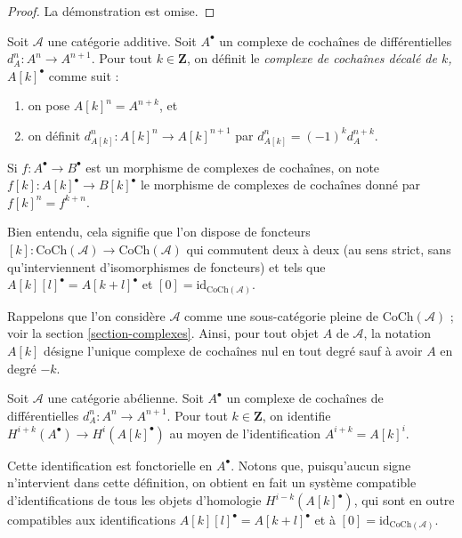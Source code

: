 \begin{proof}
La démonstration est omise.
\end{proof}

\begin{definition}
\label{definition-shift-cochain}
Soit $\mathcal{A}$ une catégorie additive.
Soit $A^\bullet$ un complexe de cochaînes
de différentielles $d_A^n : A^n \to A^{n + 1}$.
Pour tout $k \in \mathbf{Z}$, on définit le
{\it complexe de cochaînes décalé de $k$, $A[k]^\bullet$}
comme suit :
\begin{enumerate}
\item on pose $A[k]^n = A^{n + k}$, et
\item on définit $d_{A[k]}^n : A[k]^n \to A[k]^{n + 1}$
par $d_{A[k]}^n = (-1)^k d_A^{n + k}$.
\end{enumerate}
Si $f : A^\bullet \to B^\bullet$ est un morphisme de
complexes de cochaînes, on note
$f[k] : A[k]^\bullet \to B[k]^\bullet$ le
morphisme de complexes de cochaînes donné par
$f[k]^n = f^{k + n}$.
\end{definition}

\noindent
Bien entendu, cela signifie que l'on dispose de foncteurs
$[k] : \text{CoCh}(\mathcal{A}) \to \text{CoCh}(\mathcal{A})$
qui commutent deux à deux (au sens strict, sans
qu'interviennent d'isomorphismes de foncteurs) et
tels que $A[k][l]^\bullet = A[k + l]^\bullet$ et
$[0] = \text{id}_{\text{CoCh}(\mathcal{A})}$.

\medskip\noindent
Rappelons que l'on considère $\mathcal{A}$ comme une sous-catégorie pleine de
$\text{CoCh}(\mathcal{A})$ ; voir la section \ref{section-complexes}.
Ainsi, pour tout objet $A$ de $\mathcal{A}$, la notation $A[k]$
désigne l'unique complexe de cochaînes nul en tout degré sauf à avoir
$A$ en degré $-k$.

\begin{definition}
\label{definition-cohomology-shift}
Soit $\mathcal{A}$ une catégorie abélienne.
Soit $A^\bullet$ un complexe de cochaînes
de différentielles $d_A^n : A^n \to A^{n + 1}$.
Pour tout $k \in \mathbf{Z}$, on identifie
{\it $H^{i + k}(A^\bullet) \longrightarrow H^i(A[k]^\bullet)$}
au moyen de l'identification $A^{i + k} = A[k]^i$.
\end{definition}

\noindent
Cette identification est fonctorielle en $A^\bullet$.
Notons que, puisqu'aucun signe n'intervient dans cette
définition, on obtient en fait un système compatible
d'identifications de tous les objets d'homologie
$H^{i - k}(A[k]^\bullet)$, qui sont en outre
compatibles aux identifications
$A[k][l]^\bullet = A[k + l]^\bullet$ et à
$[0] = \text{id}_{\text{CoCh}(\mathcal{A})}$.

